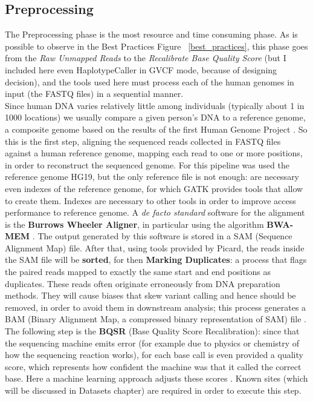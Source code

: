 \subsection{Preprocessing}
The Preprocessing phase is the most resource and time consuming phase. As is possible to observe in the Best Practices Figure ~\ref{best_practices}, this phase goes from the \textit{Raw Unmapped Reads} to the \textit{Recalibrate Base Quality Score} (but I included here even HaplotypeCaller in GVCF mode, because of designing decision), and the tools used here must process each of the human genomes in input (the FASTQ files) in a sequential manner.
\\[1\baselineskip]
Since human DNA varies relatively little among individuals (typically about 1 in 1000 locations) we usually compare a given person's DNA to a reference genome, a composite genome based on the results of the first Human Genome Project \cite{MicrosoftGenomics}. So this is the first step, aligning the sequenced reads collected in FASTQ files against a human reference genome, mapping each read to one or more positions, in order to reconstruct the sequenced genome. For this pipeline was used the reference genome HG19, but the only reference file is not enough: are necessary even indexes of the reference genome, for which GATK provides tools that allow to create them. Indexes are necessary to other tools in order to improve access performance to reference genome. A \textit{de facto standard} software for the alignment is the \textbf{Burrows Wheeler Aligner}, in particular using the algorithm \textbf{BWA-MEM} \cite{BWA}. The output generated by this software is stored in a SAM (Sequence Alignment Map) file. \newline
After that, using tools provided by Picard, the reads inside the SAM file will be \textbf{sorted}, for then \textbf{Marking Duplicates}: a process that flags the paired reads mapped to exactly the same start and end positions as duplicates. These reads often originate erroneously from DNA preparation methods. They will cause biases that skew variant calling and hence should be removed, in order to avoid them in downstream analysis; this process generates a BAM (Binary Alignment Map, a compressed binary representation of SAM) file \cite{Picard}. \newline
The following step is the \textbf{BQSR} (Base Quality Score Recalibration): since that the sequencing machine emits error (for example due to physics or chemistry of how the sequencing reaction works), for each base call is even provided a quality score, which represents how confident the machine was that it called the correct base. Here a machine learning approach adjusts these scores \cite{BQSR}. Known sites (which will be discussed in Datasets chapter) are required in order to execute this step.\newline
